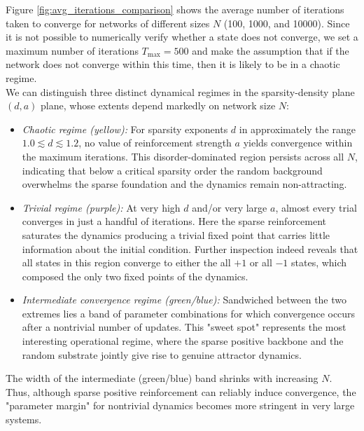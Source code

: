 \documentclass[a4paper,12pt]{report}
\begin{document}
Figure \ref{fig:avg_iterations_comparison} shows the average number of iterations
taken to converge for networks of different sizes \(N\) (100, 1000, and 10000).
Since it is not possible to numerically verify whether a state does not
converge, we set a maximum number of iterations \(T_{\max} = 500\) and 
make the assumption that if the network does not converge within this time,
then it is likely to be in a chaotic regime. \\
We can distinguish three distinct dynamical regimes in the sparsity-density
plane \((d,a)\) plane, whose extents depend markedly on network size \(N\):

\begin{itemize}
  \item \emph{Chaotic regime (yellow):}  
    For sparsity exponents \(d\) in approximately the range 
    \(1.0 \lesssim d \lesssim 1.2\), no value of reinforcement 
    strength \(a\) yields convergence within the maximum iterations.  
    This disorder-dominated region persists across all \(N\), 
    indicating that below a critical sparsity order the random 
    background overwhelms the sparse foundation and the dynamics 
    remain non-attracting.

  \item \emph{Trivial regime (purple):}  
    At very high \(d\) and/or very large \(a\), almost every trial 
    converges in just a handful of iterations.  Here the sparse 
    reinforcement saturates the dynamics producing a trivial fixed 
    point that carries little information about the initial condition. 
    Further inspection indeed reveals that all states in this region 
    converge to either the all \(+1\) or all \(-1\) states, which 
    composed the only two fixed points of the dynamics.

  \item \emph{Intermediate convergence regime (green/blue):}  
    Sandwiched between the two extremes lies a band of parameter 
    combinations for which convergence occurs after a nontrivial 
    number of updates. This "sweet spot" represents the most 
    interesting operational regime, where the sparse positive backbone 
    and the random substrate jointly give rise to genuine attractor 
    dynamics.

\end{itemize}

The width of the intermediate (green/blue) band shrinks with 
increasing \(N\). Thus, although sparse positive reinforcement can 
reliably induce convergence, the "parameter margin" for nontrivial 
dynamics becomes more stringent in very large systems.
\vspace*{0.5em}
\end{document}
